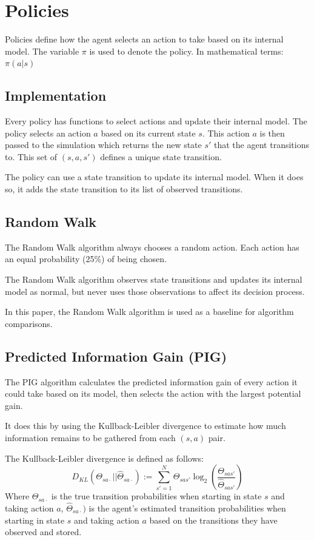 \documentclass[12pt]{thesis}
\begin{document}
\section{Policies}
Policies define how the agent selects an action to take based on its internal model. The variable $\pi$ is used to denote the policy. In mathematical terms: $\pi(a | s)$
\subsection{Implementation}
Every policy has functions to select actions and update their internal model. The policy selects an action $a$ based on its current state $s$. This action $a$ is then passed to the simulation which returns the new state $s'$ that the agent transitions to. This set of $(s,a,s')$ defines a unique state transition.

The policy can use a state transition to update its internal model. When it does so, it adds the state transition to its list of observed transitions.
\subsection{Random Walk}
The Random Walk algorithm always chooses a random action. Each action has an equal probability (25\%) of being chosen.

The Random Walk algorithm observes state transitions and updates its internal model as normal, but never uses those observations to affect its decision process.

In this paper, the Random Walk algorithm is used as a baseline for algorithm comparisons.
\subsection{Predicted Information Gain (PIG)}
The PIG algorithm calculates the predicted information gain of every action it could take based on its model, then selects the action with the largest potential gain.

It does this by using the Kullback-Leibler divergence to estimate how much information remains to be gathered from each $(s,a)$ pair. 

The Kullback-Leibler divergence is defined as follows:
\[D_{KL} (\Theta_{sa\cdot} || \hat{\Theta}_{sa\cdot}) := \sum_{s' = 1}^{ N} \Theta_{sas'} \log_{2}(\frac{\Theta_{sas'}}{\hat{\Theta}_{sas'}})   \]
Where $\Theta_{sa\cdot}$ is the true transition probabilities when starting in state $s$ and taking action $a$, $\hat{\Theta}_{sa\cdot})$ is the agent's estimated transition probabilities when starting in state $s$ and taking action $a$  based on the transitions they have observed and stored.
\end{document}
